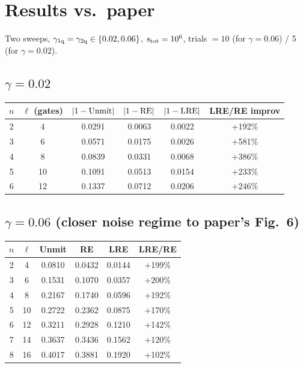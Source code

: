 \documentclass[11pt]{article}
\begin{document}
\section{Results vs.\ paper}
\label{sec:results}

Two sweeps, $\gamma_{\rm 1q}=\gamma_{\rm 2q}\in\{0.02, 0.06\}$, $s_{\rm tot}=10^6$, trials $=10$
(for $\gamma=0.06$) / 5 (for $\gamma=0.02$).

\subsection*{$\gamma = 0.02$}
\begin{center}
\begin{tabular}{cccccc}
\toprule
$n$ & $\ell$ (gates) & $|1 - {\rm Unmit}|$ & $|1 - {\rm RE}|$ & $|1 - {\rm LRE}|$ & LRE/RE improv \\
\midrule
2 &  4 & 0.0291 & 0.0063 & 0.0022 & +192\% \\
3 &  6 & 0.0571 & 0.0175 & 0.0026 & +581\% \\
4 &  8 & 0.0839 & 0.0331 & 0.0068 & +386\% \\
5 & 10 & 0.1091 & 0.0513 & 0.0154 & +233\% \\
6 & 12 & 0.1337 & 0.0712 & 0.0206 & +246\% \\
\bottomrule
\end{tabular}
\end{center}

\subsection*{$\gamma = 0.06$ (closer noise regime to paper's Fig.\ 6)}
\begin{center}
\begin{tabular}{cccccc}
\toprule
$n$ & $\ell$ & Unmit & RE & LRE & LRE/RE \\
\midrule
2 &  4 & 0.0810 & 0.0432 & 0.0144 & +199\% \\
3 &  6 & 0.1531 & 0.1070 & 0.0357 & +200\% \\
4 &  8 & 0.2167 & 0.1740 & 0.0596 & +192\% \\
5 & 10 & 0.2722 & 0.2362 & 0.0875 & +170\% \\
6 & 12 & 0.3211 & 0.2928 & 0.1210 & +142\% \\
7 & 14 & 0.3637 & 0.3436 & 0.1562 & +120\% \\
8 & 16 & 0.4017 & 0.3881 & 0.1920 & +102\% \\
\bottomrule
\end{tabular}
\end{center}
\end{document}
